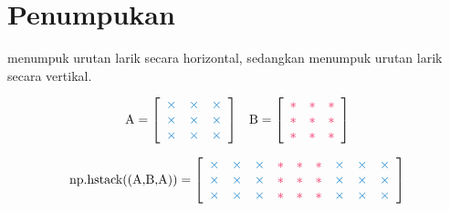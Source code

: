 \section*{Penumpukan} %

 menumpuk urutan larik secara horizontal, sedangkan  menumpuk urutan larik secara vertikal.

\begin{align*}
\text{\li{A}} = \left[\begin{array}{ccc}
\textcolor{blue}{\times}&\textcolor{blue}{\times}&\textcolor{blue}{\times}\\
\textcolor{blue}{\times}&\textcolor{blue}{\times}&\textcolor{blue}{\times}\\
\textcolor{blue}{\times}&\textcolor{blue}{\times}&\textcolor{blue}{\times}
\end{array}\right]
&&
\text{\li{B}} = \left[\begin{array}{ccc}
\textcolor{red}{*} & \textcolor{red}{*} & \textcolor{red}{*} \\
\textcolor{red}{*} & \textcolor{red}{*} & \textcolor{red}{*} \\
\textcolor{red}{*} & \textcolor{red}{*} & \textcolor{red}{*}
\end{array}\right]
\end{align*}

\begin{align*}
\text{\li{np.hstack((A,B,A))}} =
\left[\begin{array}{ccccccccc}
\textcolor{blue}{\times}&\textcolor{blue}{\times}&\textcolor{blue}{\times}&
\textcolor{red}{*} & \textcolor{red}{*} & \textcolor{red}{*}&
\textcolor{blue}{\times}&\textcolor{blue}{\times}&\textcolor{blue}{\times}\\
\textcolor{blue}{\times}&\textcolor{blue}{\times}&\textcolor{blue}{\times}&
\textcolor{red}{*} & \textcolor{red}{*} & \textcolor{red}{*}&
\textcolor{blue}{\times}&\textcolor{blue}{\times}&\textcolor{blue}{\times}\\
\textcolor{blue}{\times}&\textcolor{blue}{\times}&\textcolor{blue}{\times}&
\textcolor{red}{*} & \textcolor{red}{*} & \textcolor{red}{*}&
\textcolor{blue}{\times}&\textcolor{blue}{\times}&\textcolor{blue}{\times}
\end{array}\right]
\end{align*}

